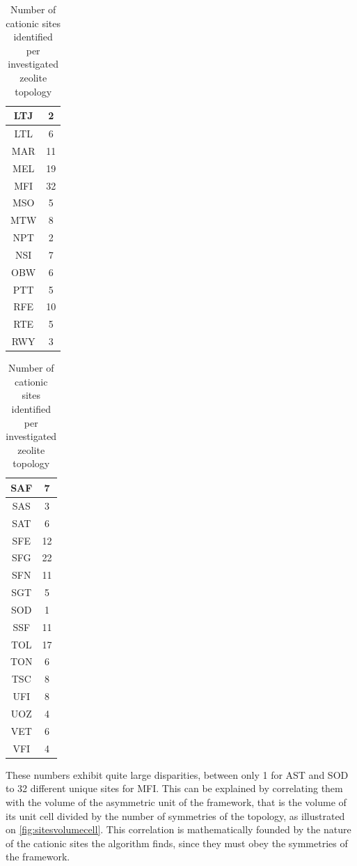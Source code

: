 \documentclass[main.tex]{subfiles}
\begin{document}
\begin{table}
\begin{minipage}[t]{0.24\linewidth}
\begin{tabular}{|c|c|}
LTJ&2\\\hline
LTL&6\\\hline
MAR&11\\\hline
MEL&19\\\hline
MFI&32\\\hline
MSO&5\\\hline
MTW&8\\\hline
NPT&2\\\hline
NSI&7\\\hline
OBW&6\\\hline
PTT&5\\\hline
RFE&10\\\hline
RTE&5\\\hline
RWY&3
\end{tabular}
\end{minipage}%
\begin{minipage}[t]{0.24\linewidth}
\vspace{0pt}\centering
\begin{tabular}{|c|c|}
SAF&7\\\hline
SAS&3\\\hline
SAT&6\\\hline
SFE&12\\\hline
SFG&22\\\hline
SFN&11\\\hline
SGT&5\\\hline
SOD&1\\\hline
SSF&11\\\hline
TOL&17\\\hline
TON&6\\\hline
TSC&8\\\hline
UFI&8\\\hline
UOZ&4\\\hline
VET&6\\\hline
VFI&4\\\hline
\end{tabular}
\end{minipage}

	\caption{Number of cationic sites identified per investigated zeolite topology}\label{tab:numsites}
\end{table}

These numbers exhibit quite large disparities, between only 1 for AST and SOD to 32 different unique sites for MFI. This can be explained by correlating them with the volume of the asymmetric unit of the framework, that is the volume of its unit cell divided by the number of symmetries of the topology, as illustrated on \cref{fig:sitesvolumecell}. This correlation is mathematically founded by the nature of the cationic sites the algorithm finds, since they must obey the symmetries of the framework.
\end{document}
